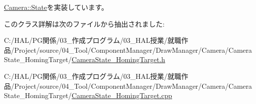 \mbox{\hyperlink{class_camera_1_1_state_a2d41e0cb783666bae6c6ea167fcc7874}{Camera\+::\+State}}を実装しています。



このクラス詳解は次のファイルから抽出されました\+:\begin{DoxyCompactItemize}
\item 
C\+:/\+H\+A\+L/\+P\+G関係/03\+\_\+作成プログラム/03\+\_\+\+H\+A\+L授業/就職作品/\+Project/source/04\+\_\+\+Tool/\+Component\+Manager/\+Draw\+Manager/\+Camera/\+Camera\+State\+\_\+\+Homing\+Target/\mbox{\hyperlink{_camera_state___homing_target_8h}{Camera\+State\+\_\+\+Homing\+Target.\+h}}\item 
C\+:/\+H\+A\+L/\+P\+G関係/03\+\_\+作成プログラム/03\+\_\+\+H\+A\+L授業/就職作品/\+Project/source/04\+\_\+\+Tool/\+Component\+Manager/\+Draw\+Manager/\+Camera/\+Camera\+State\+\_\+\+Homing\+Target/\mbox{\hyperlink{_camera_state___homing_target_8cpp}{Camera\+State\+\_\+\+Homing\+Target.\+cpp}}\end{DoxyCompactItemize}
